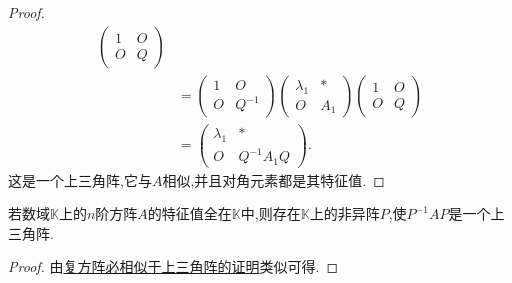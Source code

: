 \documentclass[../../main.tex]{subfiles}
\begin{document}
\begin{proof}
\begin{align*}
\begin{pmatrix}
1 & O \\
O & Q
\end{pmatrix} \\
&= \begin{pmatrix}
1 & O \\
O & Q^{-1}
\end{pmatrix} \begin{pmatrix}
\lambda_1 & * \\
O & A_1
\end{pmatrix} \begin{pmatrix}
1 & O \\
O & Q
\end{pmatrix} \\
&= \begin{pmatrix}
\lambda_1 & * \\
O & Q^{-1}A_1Q
\end{pmatrix}.
\end{align*}
这是一个上三角阵,它与$A$相似,并且对角元素都是其特征值.

\end{proof}

\begin{corollary}\label{corollary:特征值全在矩阵元素的数域中则一定相似于上三角阵}
若数域$\mathbb{K}$上的$n$阶方阵$A$的特征值全在$\mathbb{K}$中,则存在$\mathbb{K}$上的非异阵$P$,使$P^{-1}AP$是一个上三角阵.
\end{corollary}
\begin{proof}
由\hyperref[theorem:复方阵必相似于上三角阵]{复方阵必相似于上三角阵的证明}类似可得.

\end{proof}
\end{document}
